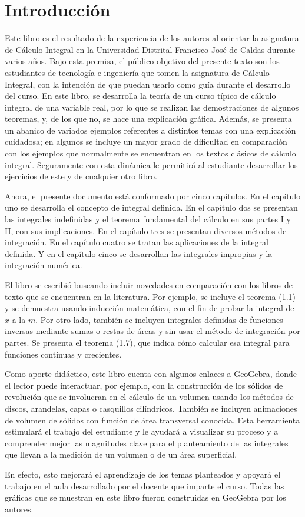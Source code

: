 \chapter*{Introducción}

Este libro es el resultado de la experiencia de los autores al orientar la asignatura de Cálculo Integral en la Universidad Distrital Francisco José de Caldas durante varios años. Bajo esta premisa, el público objetivo del presente texto son los estudiantes de tecnología e ingeniería que tomen la asignatura de Cálculo Integral, con la intención de que puedan usarlo como guía durante el desarrollo del curso.
En este libro, se desarrolla la teoría de un curso típico de cálculo integral de una variable real, por lo que se realizan las demostraciones de algunos teoremas, y, de los que no, se hace una explicación gráfica. Además, se presenta un abanico de variados ejemplos referentes a distintos temas con una explicación cuidadosa; en algunos se incluye un mayor grado de dificultad en comparación con los ejemplos que normalmente se encuentran en los textos clásicos de cálculo integral. Seguramente con esta dinámica le permitirá al estudiante desarrollar los ejercicios de este y de cualquier otro libro.

Ahora, el presente documento está conformado por cinco capítulos. En el capítulo uno se desarrolla el concepto de integral definida. En el capítulo dos se presentan las integrales indefinidas y el teorema fundamental del cálculo en sus partes I y II, con sus implicaciones. En el capítulo tres se presentan diversos métodos de integración. En el capítulo cuatro se tratan las aplicaciones de la integral definida. Y en el capítulo cinco se desarrollan las integrales impropias y la integración numérica.

El libro se escribió buscando incluir novedades en comparación con los libros de texto que se encuentran en la literatura. Por ejemplo, se incluye el teorema (1.1) y se demuestra usando inducción matemática, con el fin de probar la integral de $x$ a la $m$.
Por otro lado, también se incluyen integrales definidas de funciones inversas mediante sumas o restas de áreas y sin usar el método de integración por partes. Se presenta el teorema (1.7), que indica cómo calcular esa integral para funciones continuas y crecientes.

Como aporte didáctico, este libro cuenta con algunos enlaces a GeoGebra, donde el lector puede interactuar, por ejemplo, con la construcción de los sólidos de revolución que se involucran en el cálculo de un volumen usando los métodos de discos, arandelas, capas o casquillos cilíndricos. También se incluyen animaciones de volumen de sólidos con función de área transversal conocida. Esta herramienta estimulará el trabajo del estudiante y le ayudará a visualizar su proceso y a comprender mejor las magnitudes clave para el planteamiento de las integrales que llevan a la medición de un volumen o de un área superficial.

En efecto, esto mejorará el aprendizaje de los temas planteados y apoyará el trabajo en el aula desarrollado por el docente que imparte el curso. Todas las gráficas que se muestran en este libro fueron construidas en GeoGebra por los autores.
